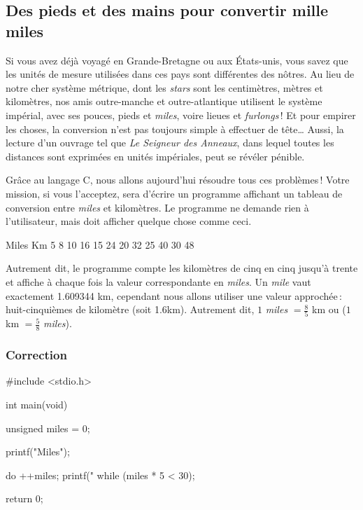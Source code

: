\subsection{Des pieds et des mains pour convertir mille miles}
\label{des-pieds-et-des-mains-pour-convertir-mille-miles}

Si vous avez déjà voyagé en Grande-Bretagne ou aux États-unis, vous
savez que les unités de mesure utilisées dans ces pays sont différentes
des nôtres. Au lieu de notre cher système métrique, dont les
\emph{stars} sont les centimètres, mètres et kilomètres, nos amis
outre-manche et outre-atlantique utilisent le système impérial, avec ses
pouces, pieds et \emph{miles}, voire lieues et \emph{furlongs} ! Et pour
empirer les choses, la conversion n'est pas toujours simple à effectuer
de tête\ldots{} Aussi, la lecture d'un ouvrage tel que \emph{Le Seigneur
des Anneaux}, dans lequel toutes les distances sont exprimées en unités
impériales, peut se révéler pénible.

Grâce au langage C, nous allons aujourd'hui résoudre tous ces
problèmes ! Votre mission, si vous l'acceptez, sera d'écrire un
programme affichant un tableau de conversion entre \emph{miles} et
kilomètres. Le programme ne demande rien à l'utilisateur, mais doit
afficher quelque chose comme ceci.

\begin{C}
Miles    Km
5        8
10       16
15       24
20       32
25       40
30       48
\end{C}

Autrement dit, le programme compte les kilomètres de cinq en cinq
jusqu'à trente et affiche à chaque fois la valeur correspondante en
\emph{miles}. Un \emph{mile} vaut exactement 1.609344 km, cependant nous
allons utiliser une valeur approchée : huit-cinquièmes de kilomètre
(soit 1.6km). Autrement dit, \(1\) \emph{miles} \(= \frac{8}{5}\) km ou
(\(1\) km \(= \frac{5}{8}\) \emph{miles}).

\subsubsection*{Correction}
\label{correction-7}

\begin{C}
 #include <stdio.h>


int main(void)
{
    unsigned miles = 0;

    printf("Miles\tKm\n");

    do
    {
        ++miles;
        printf("%
    } while (miles * 5 < 30);
    
    return 0;
}
\end{C}

